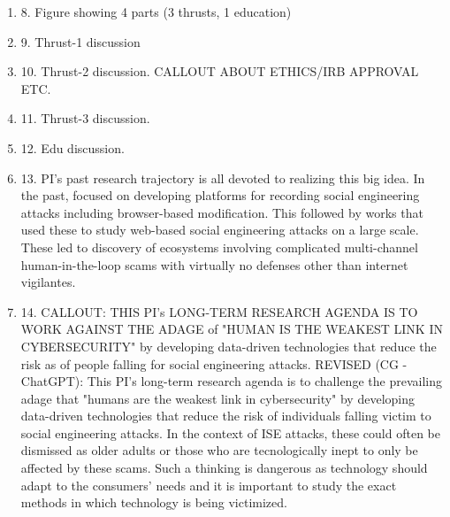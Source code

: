 \begin{enumerate}




\item 8. Figure showing 4 parts (3 thrusts, 1 education)

\item 9. Thrust-1 discussion
\item 10. Thrust-2 discussion. CALLOUT ABOUT ETHICS/IRB APPROVAL ETC.
\item 11. Thrust-3 discussion.
\item 12. Edu discussion. 

\item 13. PI's past research trajectory is all devoted to realizing this big idea. In the past, focused on developing platforms for recording social engineering attacks including browser-based modification. This followed by works that used these to study web-based social engineering attacks on a large scale. These led to discovery of ecosystems involving complicated multi-channel human-in-the-loop scams with virtually no defenses other than internet vigilantes. 

\item 14. CALLOUT: THIS PI's LONG-TERM RESEARCH AGENDA IS TO WORK AGAINST THE ADAGE of "HUMAN IS THE WEAKEST LINK IN CYBERSECURITY" by developing data-driven technologies that reduce the risk as of people falling for social engineering attacks. 
REVISED (CG - ChatGPT): This PI's long-term research agenda is to challenge the prevailing adage that "humans are the weakest link in cybersecurity" by developing data-driven technologies that reduce the risk of individuals falling victim to social engineering attacks. In the context of ISE attacks, these could often be dismissed as older adults or those who are tecnologically inept to only be affected by these scams. Such a thinking is dangerous as technology should adapt to the consumers' needs and it is important to study the exact methods in which technology is being victimized.


\end{enumerate}




